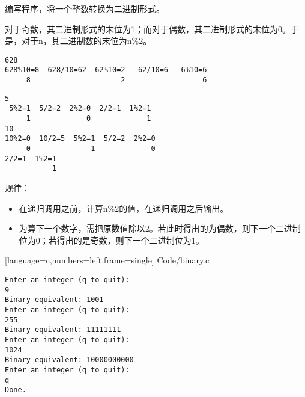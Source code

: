 \begin{frame}[fragile]
编写程序，将一个整数转换为二进制形式。
\end{frame}

\begin{frame}[fragile]
对于奇数，其二进制形式的末位为1；而对于偶数，其二进制形式的末位为0。于是，\textcolor{acolor1}{对于n，其二进制数的末位为n\%2。}
\begin{lstlisting}[backgroundcolor=\color{red!10}]
628
628%10=8  628/10=62  62%10=2   62/10=6   6%10=6
     8                     2                  6
\end{lstlisting}

\begin{lstlisting}[backgroundcolor=\color{red!10}]
5  
 5%2=1  5/2=2  2%2=0  2/2=1  1%2=1
     1             0             1 
10
10%2=0  10/2=5  5%2=1  5/2=2  2%2=0  
     0              1             0
2/2=1  1%2=1
           1
\end{lstlisting}

\end{frame}

\begin{frame}[fragile]
规律：
\vspace{0.1in}

\begin{itemize}
\item 
在递归调用之前，计算{\tf n\%2}的值，在递归调用之后输出。\\[0.1in]
\item
为算下一个数字，需把原数值除以2。若此时得出的为偶数，则下一个二进制位为0；若得出的是奇数，则下一个二进制位为1。
\end{itemize}
\end{frame}

\begin{frame}

  [language=c,numbers=left,frame=single]
  {Code/binary.c}
\end{frame}



\begin{frame}[fragile]
\begin{lstlisting}[backgroundcolor=\color{red!10}]
Enter an integer (q to quit):
9
Binary equivalent: 1001
Enter an integer (q to quit):
255
Binary equivalent: 11111111
Enter an integer (q to quit):
1024
Binary equivalent: 10000000000
Enter an integer (q to quit):
q
Done.
\end{lstlisting}
\end{frame}


